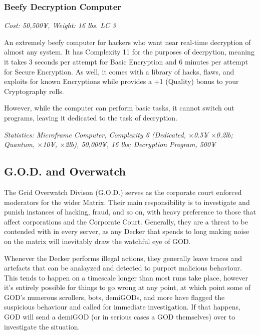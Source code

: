 \begin{multicols}{3}
	
	\subsubsection*{Beefy Decryption Computer}
	
	\textit{\textcolor{NavyBlue}{Cost: 50,500¥, Weight: 16 lbs. LC 3}}
	
	An extremely beefy computer for hackers who want near real-time decryption of almost any system. It has Complexity 11 for the purposes of decrpytion, meaning it takes 3 seconds per attempt for Basic Encryption and 6 minutes per attempt for Secure Encryption. As well, it comes with a library of hacks, flaws, and exploits for known Encryptions while provides a +1 (Quality) bonus to your Cryptography rolls.
	
	However, while the computer can perform basic tasks, it cannot switch out programs, leaving it dedicated to the task of decryption.
	
	\textit{\textcolor{OliveGreen}{Statistics: Microframe Computer, Complexity 6 (Dedicated, \(\times\)0.5¥ \(\times\)0.2lb; Quantum, \(\times\)10¥, \(\times\)2lb), 50,000¥, 16 lbs; Decryption Program, 500¥}}
	
	\subsection{G.O.D. and Overwatch}
	
	The Grid Overwatch Divison (G.O.D.) serves as the corporate court enforced moderators for the wider Matrix. Their main responsibility is to investigate and punish instances of hacking, fraud, and so on, with heavy preference to those that affect corporations and the Corporate Court. Generally, they are a threat to be contended with in every server, as any Decker that spends to long making noise on the matrix will inevitably draw the watchful eye of GOD. 
	
	Whenever the Decker performs illegal actions, they generally leave traces and artefacts that can be analayzed and detected to purport malicious behaviour. This tends to happen on a timescale longer than most runs take place, however it's entirely possible for things to go wrong at any point, at which point some of GOD's numerous scrollers, bots, demiGODs, and more have flagged the suspicious behaviour and called for immediate investigation. If that happens, GOD will send a demiGOD (or in serious cases a GOD themselves) over to investigate the situation.
	

\end{multicols}
